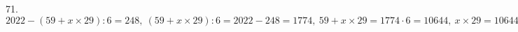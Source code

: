 71. $2022-(59+x\times29):6=248,\ (59+x\times29):6=2022-248=1774,\ 59+x\times29=1774\cdot6=10644,\ x\times29=10644-59=10585,\ x=10585:29=365.$\\
